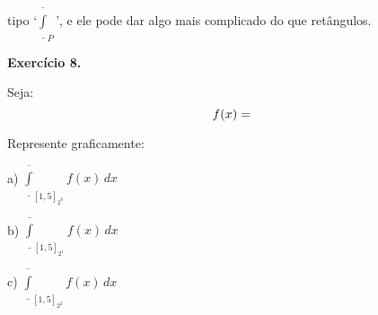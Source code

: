 \documentclass[oneside,12pt]{article}
\begin{document}
tipo `$\overline{\underline{∫}}_P$', e ele pode dar algo mais
complicado do que retângulos.

\newpage

{\bf Exercício 8.}

\def\Intoverunder #1#2{\overline{\underline{∫}}_{#1} #2\,dx}


Seja:
%
$$f(x) = \scalebox{0.5}{$\ga{Exercicio 5}$}$$

\def\iou#1{\overline{\underline{∫}}_{[1,5]_{2^#1}} {f(x)} \, dx}

Represente graficamente:

\ssk

a) $\iou0$

b) $\iou1$

c) $\iou2$






\newpage



% 
% 
% 
% 
% 



















\end{document}

